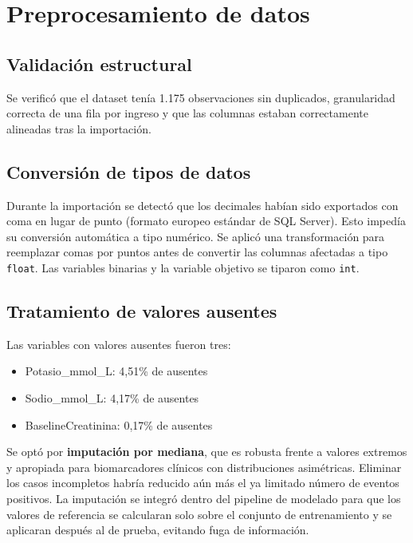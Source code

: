 \documentclass[12pt, a4paper, oneside]{report}
\begin{document}
\section{Preprocesamiento de datos}

\subsection{Validación estructural}

Se verificó que el dataset tenía 1.175 observaciones sin duplicados, granularidad correcta de una fila por ingreso y que las columnas estaban correctamente alineadas tras la importación.

\subsection{Conversión de tipos de datos}

Durante la importación se detectó que los decimales habían sido exportados con coma en lugar de punto (formato europeo estándar de SQL Server). Esto impedía su conversión automática a tipo numérico. Se aplicó una transformación para reemplazar comas por puntos antes de convertir las columnas afectadas a tipo \texttt{float}. Las variables binarias y la variable objetivo se tiparon como \texttt{int}.

\subsection{Tratamiento de valores ausentes}

Las variables con valores ausentes fueron tres:

\begin{itemize}
    \item Potasio\_mmol\_L: 4,51\% de ausentes
    \item Sodio\_mmol\_L: 4,17\% de ausentes
    \item BaselineCreatinina: 0,17\% de ausentes
\end{itemize}

Se optó por \textbf{imputación por mediana}, que es robusta frente a valores extremos y apropiada para biomarcadores clínicos con distribuciones asimétricas. Eliminar los casos incompletos habría reducido aún más el ya limitado número de eventos positivos. La imputación se integró dentro del pipeline de modelado para que los valores de referencia se calcularan solo sobre el conjunto de entrenamiento y se aplicaran después al de prueba, evitando fuga de información.
\end{document}
